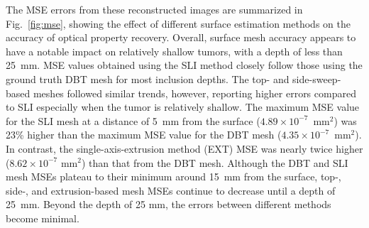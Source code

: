The MSE errors from these reconstructed images are summarized in Fig.~\ref{fig:mse}, showing the effect of different surface estimation methods on the accuracy of optical property recovery. Overall, surface mesh accuracy appears to have a notable impact on relatively shallow tumors, with a depth of less than 25~mm. MSE values obtained using the SLI method closely follow those using the ground truth DBT mesh for most inclusion depths. The top- and side-sweep-based meshes followed similar trends, however, reporting higher errors compared to SLI especially when the tumor is relatively shallow. The maximum MSE value for the SLI mesh at a distance of 5~mm from the surface ($4.89\times 10^{-7}$~mm$^2$) was 23\% higher than the maximum MSE value for the DBT mesh ($4.35\times 10^{-7}$~mm$^2$). In contrast, the single-axis-extrusion method (EXT) MSE was nearly twice higher ($8.62\times 10^{-7}$ mm$^2$) than that from the DBT mesh. Although the DBT and SLI mesh MSEs plateau to their minimum around 15~mm from the surface, top-, side-, and extrusion-based mesh MSEs continue to decrease until a depth of 25~mm. Beyond the depth of 25 mm, the errors between different methods become minimal.

